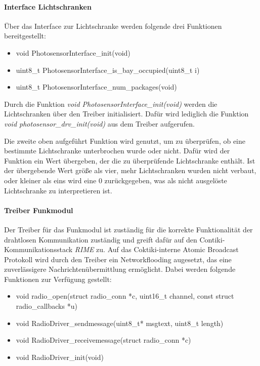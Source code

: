 \paragraph{Interface Lichtschranken}
Über das Interface zur Lichtschranke werden folgende drei Funktionen bereitgestellt:
\begin{itemize}
  \item void PhotosensorInterface\_init(void)
  \item uint8\_t PhotosensorInterface\_is\_bay\_occupied(uint8\_t i)
  \item uint8\_t PhotosensorInterface\_num\_packages(void)
\end{itemize}
Durch die Funktion \textit{void PhotosensorInterface\_init(void)} werden die Lichtschranken über den Treiber initialisiert. Dafür wird lediglich die Funktion \textit{void photosensor\_drv\_init(void)} aus dem Treiber aufgerufen.

Die zweite oben aufgeführt Funktion wird genutzt, um zu überprüfen, ob eine bestimmte Lichtschranke unterbrochen wurde oder nicht. Dafür wird der Funktion ein Wert übergeben, der die zu überprüfende Lichtschranke enthält. Ist der übergebende Wert größe als vier, mehr Lichtschranken wurden nicht verbaut, oder kleiner als eins wird eine 0 zurückgegeben, was als nicht ausgelöste Lichtschranke zu interpretieren ist.

\paragraph{Treiber Funkmodul}
Der Treiber für das Funkmodul ist zuständig für die korrekte Funktionalität der drahtlosen Kommunikation zuständig und greift dafür auf den Contiki-Kommunikationsstack \textit{RIME} zu. Auf das Coktiki-interne Atomic Broadcast Protokoll wird durch den Treiber ein Networkflooding augesetzt, das eine zuverlässigere Nachrichtenübermittlung ermöglicht. Dabei werden folgende Funktionen zur Verfügung gestellt:\begin{itemize}
  \item void radio\_open(struct radio\_conn *c, uint16\_t channel, const struct radio\_callbacks *u)
  \item void RadioDriver\_sendmessage(uint8\_t* msgtext, uint8\_t length)
  \item void RadioDriver\_receivemessage(struct radio\_conn *c)
  \item void RadioDriver\_init(void)
\end{itemize}


